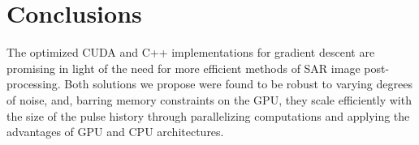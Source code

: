 \section{Conclusions}\label{sec:conclusions}

The optimized CUDA and C++ implementations for gradient descent are promising
in light of the need for more efficient methods of SAR image post-processing.
Both solutions we propose were found to be robust to varying degrees of noise,
and, barring memory constraints on the GPU, they scale efficiently with the
size of the pulse history through parallelizing computations and applying the
advantages of GPU and CPU architectures.
